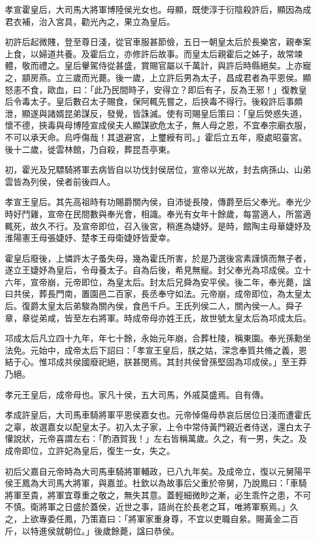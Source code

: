 \begin{pinyinscope}
孝宣霍皇后，大司馬大將軍博陸侯光女也。母顯，既使淳于衍陰殺許后，顯因為成君衣補，治入宮具，勸光內之，果立為皇后。

初許后起微賤，登至尊日淺，從官車服甚節儉，五日一朝皇太后於長樂宮，親奉案上食，以婦道共養。及霍后立，亦修許后故事。而皇太后親霍后之姊子，故常竦體，敬而禮之。皇后轝駕侍從甚盛，賞賜官屬以千萬計，與許后時縣絕矣。上亦寵之，顓房燕。立三歲而光薨。後一歲，上立許后男為太子，昌成君者為平恩侯。顯怒恚不食，歐血，曰：「此乃民間時子，安得立？即后有子，反為王邪！」復教皇后令毒太子。皇后數召太子賜食，保阿輒先嘗之，后挾毒不得行。後殺許后事頗泄，顯遂與諸婿昆弟謀反，發覺，皆誅滅。使有司賜皇后策曰：「皇后熒惑失道，懷不德，挾毒與母博陸宣成侯夫人顯謀欲危太子，無人母之恩，不宜奉宗廟衣服，不可以承天命。烏呼傷哉！其退避宮，上璽綬有司。」霍后立五年，廢處昭臺宮。後十二歲，徙雲林館，乃自殺，葬昆吾亭東。

初，霍光及兄驃騎將軍去病皆自以功伐封侯居位，宣帝以光故，封去病孫山、山弟雲皆為列侯，侯者前後四人。

孝宣王皇后。其先高祖時有功賜爵關內侯，自沛徙長陵，傳爵至后父奉光。奉光少時好鬥雞，宣帝在民間數與奉光會，相識。奉光有女年十餘歲，每當適人，所當適輒死，故久不行。及宣帝即位，召入後宮，稍進為婕妤。是時，館陶主母華婕妤及淮陽憲王母張婕妤、楚孝王母衛婕妤皆愛幸。

霍皇后廢後，上憐許太子蚤失母，幾為霍氏所害，於是乃選後宮素謹慎而無子者，遂立王婕妤為皇后，令母養太子。自為后後，希見無寵。封父奉光為邛成侯。立十六年，宣帝崩，元帝即位，為皇太后。封太后兄舜為安平侯。後二年，奉光薨，諡曰共侯，葬長門南，置園邑二百家，長丞奉守如法。元帝崩，成帝即位，為太皇太后。復爵太皇太后弟駿為關內侯，食邑千戶。王氏列侯二人，關內侯一人。舜子章，章從弟咸，皆至左右將軍。時成帝母亦姓王氏，故世號太皇太后為邛成太后。

邛成太后凡立四十九年，年七十餘，永始元年崩，合葬杜陵，稱東園。奉光孫勳坐法免。元始中，成帝太后下詔曰：「孝宣王皇后，朕之姑，深念奉質共脩之義，恩結于心。惟邛成共侯國廢祀絕，朕甚閔焉。其封共侯曾孫堅固為邛成侯。」至王莽乃絕。

孝元王皇后，成帝母也。家凡十侯，五大司馬，外戚莫盛焉。自有傳。

孝成許皇后，大司馬車騎將軍平恩侯嘉女也。元帝悼傷母恭哀后居位日淺而遭霍氏之辜，故選嘉女以配皇太子。初入太子家，上令中常侍黃門親近者侍送，還白太子懽說狀，元帝喜謂左右：「酌酒賀我！」左右皆稱萬歲。久之，有一男，失之。及成帝即位，立許妃為皇后，復生一女，失之。

初后父嘉自元帝時為大司馬車騎將軍輔政，已八九年矣。及成帝立，復以元舅陽平侯王鳳為大司馬大將軍，與嘉並。杜欽以為故事后父重於帝舅，乃說鳳曰：「車騎將軍至貴，將軍宜尊重之敬之，無失其意。蓋輕細微眇之漸，必生乖忤之患，不可不慎。衛將軍之日盛於蓋侯，近世之事，語尚在於長老之耳，唯將軍察焉。」久之，上欲專委任鳳，乃策嘉曰：「將軍家重身尊，不宜以吏職自絫。賜黃金二百斤，以特進侯就朝位。」後歲餘薨，諡曰恭侯。


\end{pinyinscope}
